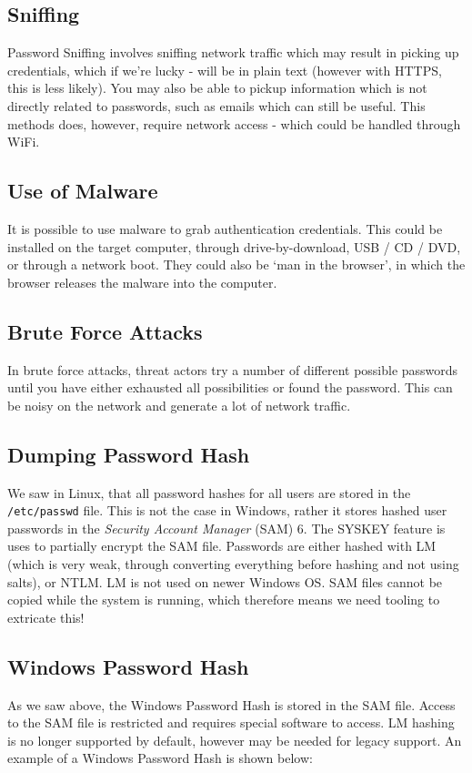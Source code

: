 \subsection{Sniffing}
Password Sniffing involves sniffing network traffic which may result in picking up credentials, which if we're lucky - will be in plain text (however with HTTPS, this is less likely). You may also be able to pickup information which is not directly related to passwords, such as emails which can still be useful. This methods does, however, require network access - which could be handled through WiFi.

\subsection{Use of Malware}
It is possible to use malware to grab authentication credentials. This could be installed on the target computer, through drive-by-download, USB / CD / DVD, or through a network boot. They could also be `man in the browser', in which the browser releases the malware into the computer. 

\subsection{Brute Force Attacks}
In brute force attacks, threat actors try a number of different possible passwords until you have either exhausted all possibilities or found the password. This can be noisy on the network and generate a lot of network traffic.

\subsection{Dumping Password Hash}
We saw in Linux, that all password hashes for all users are stored in the \verb|/etc/passwd| file. This is not the case in Windows, rather it stores hashed user passwords in the \textit{Security Account Manager} (SAM) 6. The SYSKEY feature is uses to partially encrypt the SAM file. Passwords are either hashed with LM (which is very weak, through converting everything before hashing and not using salts), or NTLM. LM is not used on newer Windows OS. SAM files cannot be copied while the system is running, which therefore means we need tooling to extricate this!

\subsection{Windows Password Hash}
As we saw above, the Windows Password Hash is stored in the SAM file. Access to the SAM file is restricted and requires special software to access. LM hashing is no longer supported by default, however may be needed for legacy support. An example of a Windows Password Hash is shown below:


